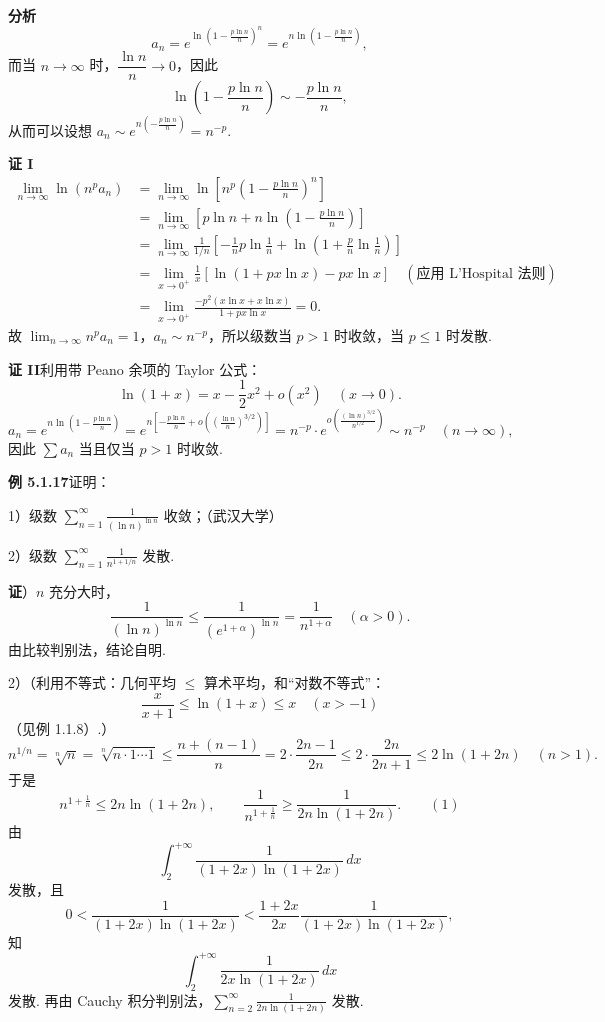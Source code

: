 \documentclass[UTF8,12pt,a4paper,fontset=fandol]{ctexart}
\begin{document}
\noindent\textbf{分析}\quad
\[
  a_n=e^{\ln\left(1-\frac{p\ln n}{n}\right)^n}
  =e^{n\ln\left(1-\frac{p\ln n}{n}\right)},
\]
而当 $n\to\infty$ 时，$\dfrac{\ln n}{n}\to0$，因此
\[
  \ln\left(1-\frac{p\ln n}{n}\right)\sim-\frac{p\ln n}{n},
\]
从而可以设想 $a_n\sim e^{n\left(-\frac{p\ln n}{n}\right)}=n^{-p}$.

\noindent\textbf{证 I}\quad
\[
\begin{aligned}
\lim_{n\to\infty}\ln(n^p a_n)
&=\lim_{n\to\infty}\ln\left[n^p\left(1-\frac{p\ln n}{n}\right)^n\right]\\
&=\lim_{n\to\infty}\left[p\ln n+n\ln\left(1-\frac{p\ln n}{n}\right)\right]\\
&=\lim_{n\to\infty}\frac1{1/n}\left[-\frac1n p\ln\frac1n+\ln\left(1+\frac pn\ln\frac1n\right)\right]\\
&=\lim_{x\to0^+}\frac1x[\ln(1+px\ln x)-px\ln x]\quad(\text{应用 L'Hospital 法则})\\
&=\lim_{x\to0^+}\frac{-p^2(x\ln x+x\ln x)}{1+px\ln x}=0.
\end{aligned}
\]
故 $\displaystyle\lim_{n\to\infty}n^p a_n=1$，$a_n\sim n^{-p}$，所以级数当 $p>1$ 时收敛，当 $p\le1$ 时发散.

\noindent\textbf{证 II}\quad 利用带 Peano 余项的 Taylor 公式：
\[
  \ln(1+x)=x-\frac12x^2+o(x^2)\quad(x\to0).
\]
\[
  a_n=e^{n\ln\left(1-\frac{p\ln n}{n}\right)}
  =e^{n\left[-\frac{p\ln n}{n}+o\left(\left(\frac{\ln n}{n}\right)^{3/2}\right)\right]}
  =n^{-p}\cdot e^{o\left(\frac{(\ln n)^{3/2}}{n^{1/2}}\right)}
  \sim n^{-p}\quad(n\to\infty),
\]
因此 $\sum a_n$ 当且仅当 $p>1$ 时收敛.

\noindent\textbf{例 5.1.17}\quad 证明：

1）级数 $\displaystyle\sum_{n=1}^\infty \frac1{(\ln n)^{\ln n}}$ 收敛；（武汉大学）

2）级数 $\displaystyle\sum_{n=1}^\infty \frac1{n^{1+1/n}}$ 发散.

\noindent\textbf{证}）$n$ 充分大时，
\[
  \frac1{(\ln n)^{\ln n}}\le
  \frac1{(e^{1+\alpha})^{\ln n}}=\frac1{n^{1+\alpha}}\quad(\alpha>0).
\]
由比较判别法，结论自明.

2）（利用不等式：几何平均 $\le$ 算术平均，和“对数不等式”：
\[
  \frac{x}{x+1}\le\ln(1+x)\le x\quad(x>-1)
\]
（见例 1.1.8）.）
\[
  n^{1/n}=\sqrt[n]{n}=\sqrt[n]{n\cdot1\cdots1}
  \le \frac{n+(n-1)}n=2\cdot\frac{2n-1}{2n}
  \le2\cdot\frac{2n}{2n+1}\le2\ln(1+2n)\quad(n>1).
\]
于是
\[
  n^{1+\frac1n}\le2n\ln(1+2n),
\qquad
  \frac1{n^{1+\frac1n}}\ge\frac1{2n\ln(1+2n)}.
\qquad(1)
\]
由
\[
  \int_2^{+\infty}\frac1{(1+2x)\ln(1+2x)}\,dx
\]
发散，且
\[
  0<\frac1{(1+2x)\ln(1+2x)}
  <\frac{1+2x}{2x}\frac1{(1+2x)\ln(1+2x)},
\]
知
\[
  \int_2^{+\infty}\frac1{2x\ln(1+2x)}\,dx
\]
发散. 再由 Cauchy 积分判别法，$\displaystyle\sum_{n=2}^\infty\frac1{2n\ln(1+2n)}$ 发散.
\end{document}
